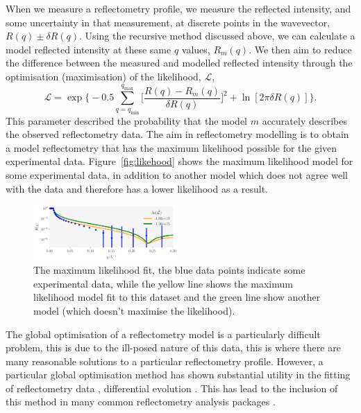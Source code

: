 \documentclass[
 reprint,
 superscriptaddress,
 amsmath,amssymb,
 aps,
]{revtex4-1}
\begin{document}
When we measure a reflectometry profile, we measure the reflected intensity, and some uncertainty in that measurement, at discrete points in the wavevector, $R(q) \pm \delta R(q)$. 
Using the recursive method discussed above, we can calculate a model reflected intensity at these same $q$ values, $R_m(q)$. 
We then aim to reduce the difference between the measured and modelled reflected intensity through the optimisation (maximisation) of the likelihood, $\mathcal{L}$, 
%
\begin{equation}
    \mathcal{L} = \exp{\bigg\{-0.5 \sum_{q=q_{\text{min}}}^{q_{\text{max}}} \bigg[\frac{R(q) - R_m(q)}{\delta R(q)}\bigg]^2 + \ln[2\pi \delta R(q)]\bigg\}}.
\end{equation}
%
This parameter described the probability that the model $m$ accurately describes the observed reflectometry data. 
The aim in reflectometry modelling is to obtain a model reflectometry that has the maximum likelihood possible for the given experimental data. 
Figure~\ref{fig:likehood} shows the maximum likelihood model for some experimental data, in addition to another model which does not agree well with the data and therefore has a lower likelihood as a result. 
%
\begin{figure}[t]
    \includegraphics[width=0.49\textwidth]{likelihood}
    \caption{The maximum likelihood fit, the blue data points indicate some experimental data, while the yellow line shows the maximum likelihood model fit to this dataset and the green line show another model (which doesn't maximise the likelihood).}
    \label{fig:likelihood}
\end{figure}
%

The global optimisation of a reflectometry model is a particularly difficult problem, this is due to the ill-posed nature of this data, this is where there are many reasonable solutions to a particular reflectometry profile.
However, a particular global optimisation method has shown substantial utility in the fitting of reflectometry data \cite{varderlee_comparison_2007}, differential evolution \cite{wormington_characterization_1999}.
This has lead to the inclusion of this method in many common reflectometry analysis packages \cite{bjorck_fitting_2011}.
\end{document}
